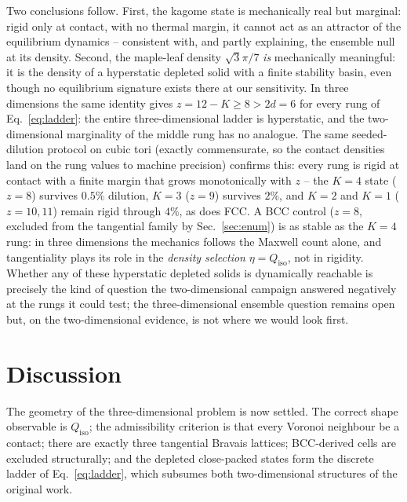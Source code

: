 \documentclass[aps,prl,twocolumn,superscriptaddress,floatfix]{revtex4-2}
\begin{document}
Two conclusions follow. First, the kagome state is mechanically real but
marginal: rigid only at contact, with no thermal margin, it cannot act as
an attractor of the equilibrium dynamics -- consistent with, and partly
explaining, the ensemble null at its density. Second, the maple-leaf
density $\sqrt{3}\pi/7$ \emph{is} mechanically meaningful: it is the
density of a hyperstatic depleted solid with a finite stability basin,
even though no equilibrium signature exists there at our sensitivity. In
three dimensions the same identity gives $z=12-K\geq8>2d=6$ for every
rung of Eq.~\eqref{eq:ladder}: the entire three-dimensional ladder is
hyperstatic, and the two-dimensional marginality of the middle rung has no
analogue. The same seeded-dilution protocol on cubic tori (exactly
commensurate, so the contact densities land on the rung values to machine
precision) confirms this: every rung is rigid at contact with a finite
margin that grows monotonically with $z$ -- the $K{=}4$ state ($z{=}8$)
survives $0.5\%$ dilution, $K{=}3$ ($z{=}9$) survives $2\%$, and $K{=}2$
and $K{=}1$ ($z{=}10,11$) remain rigid through $4\%$, as does FCC. A BCC
control ($z{=}8$, excluded from the tangential family by
Sec.~\ref{sec:enum}) is as stable as the $K{=}4$ rung: in three dimensions
the mechanics follows the Maxwell count alone, and tangentiality plays its
role in the \emph{density selection} $\eta=Q_{\mathrm{iso}}$, not in
rigidity. Whether any of these hyperstatic depleted solids is dynamically
reachable is precisely the kind of question the two-dimensional campaign
answered negatively at the rungs it could test; the three-dimensional
ensemble question remains open but, on the two-dimensional evidence, is not
where we would look first.

\section{Discussion}
\label{sec:disc}

The geometry of the three-dimensional problem is now settled. The correct shape
observable is $Q_{\mathrm{iso}}$; the admissibility criterion is that every
Voronoi neighbour be a contact; there are exactly three tangential Bravais
lattices; BCC-derived cells are excluded structurally; and the depleted
close-packed states form the discrete ladder of Eq.~\eqref{eq:ladder}, which
subsumes both two-dimensional structures of the original work.
\end{document}
